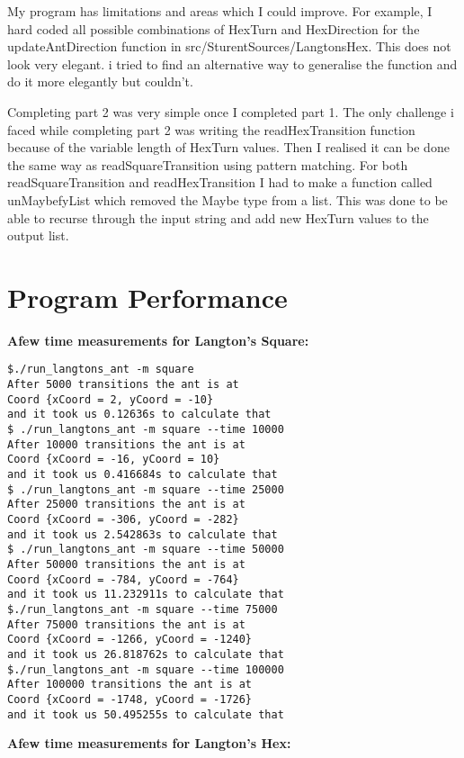 \documentclass[12pt]{article}
\begin{document}
My program has limitations and areas which I could improve.
For example, I hard coded all possible combinations of HexTurn and HexDirection for the updateAntDirection function in src/SturentSources/LangtonsHex. This does not look very elegant. i tried to find an alternative way to generalise the function and do it more elegantly but couldn't.

Completing part 2 was very simple once I completed part 1.
The only challenge i faced while completing part 2 was writing the readHexTransition function because of the variable length of HexTurn values. Then I realised it can be done the same way as readSquareTransition using pattern matching. For both readSquareTransition and readHexTransition I had to make a function called unMaybefyList which removed the Maybe type from a list. This was done to be able to recurse through the input string and add new HexTurn values to the output list.

\break

\section{Program Performance}

\hfil

\noindent \large{\textbf{Afew time measurements for Langton's Square: }}

\begin{lstlisting}
$./run_langtons_ant -m square
After 5000 transitions the ant is at
Coord {xCoord = 2, yCoord = -10}
and it took us 0.12636s to calculate that
$ ./run_langtons_ant -m square --time 10000
After 10000 transitions the ant is at
Coord {xCoord = -16, yCoord = 10}
and it took us 0.416684s to calculate that
$ ./run_langtons_ant -m square --time 25000
After 25000 transitions the ant is at
Coord {xCoord = -306, yCoord = -282}
and it took us 2.542863s to calculate that
$ ./run_langtons_ant -m square --time 50000
After 50000 transitions the ant is at
Coord {xCoord = -784, yCoord = -764}
and it took us 11.232911s to calculate that
$./run_langtons_ant -m square --time 75000
After 75000 transitions the ant is at
Coord {xCoord = -1266, yCoord = -1240}
and it took us 26.818762s to calculate that
$./run_langtons_ant -m square --time 100000
After 100000 transitions the ant is at
Coord {xCoord = -1748, yCoord = -1726}
and it took us 50.495255s to calculate that
\end{lstlisting}

\break

\noindent \large{\textbf{Afew time measurements for Langton's Hex: }}
\end{document}
